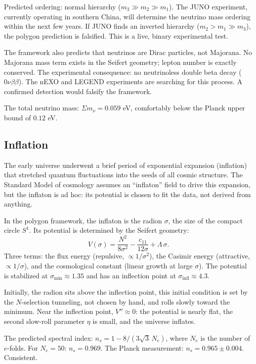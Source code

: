 Predicted ordering: normal hierarchy ($m_3 \gg m_2 \gg m_1$).
The JUNO experiment, currently operating in southern China, will
determine the neutrino mass ordering within the next few years. If
JUNO finds an inverted hierarchy ($m_2 > m_1 \gg m_3$), the polygon
prediction is falsified. This is a live, binary experimental test.

The framework also predicts that neutrinos are Dirac particles, not
Majorana. No Majorana mass term exists in the Seifert geometry; lepton
number is exactly conserved. The experimental consequence: no
neutrinoless double beta decay ($0\nu\beta\beta$). The nEXO and
LEGEND experiments are searching for this process. A confirmed
detection would falsify the framework.

The total neutrino mass: $\Sigma m_\nu = 0.059$ eV, comfortably
below the Planck upper bound of $0.12$ eV.

\subsection*{Inflation}

The early universe underwent a brief period of exponential
expansion (inflation) that stretched quantum fluctuations into the
seeds of all cosmic structure. The Standard Model of cosmology
assumes an ``inflaton'' field to drive this expansion, but the
inflaton is ad hoc: its potential is chosen to fit the data, not
derived from anything.

In the polygon framework, the inflaton is the radion $\sigma$, the
size of the compact circle $S^1$. Its potential is determined by the
Seifert geometry:
\[
  V(\sigma) = \frac{N^2}{8\sigma^2} - \frac{c_{11}}{12\sigma}
  + \Lambda\,\sigma.
\]
Three terms: the flux energy (repulsive, $\propto 1/\sigma^2$), the
Casimir energy (attractive, $\propto 1/\sigma$), and the cosmological
constant (linear growth at large $\sigma$). The potential is stabilized
at $\sigma_{\min} \approx 1.35$ and has an inflection point at
$\sigma_{\mathrm{infl}} \approx 4.3$.

Initially, the radion sits above the inflection point, this initial condition
is set by the $N$-selection tunneling, not chosen by hand, and rolls
slowly toward the minimum. Near the inflection point, $V'' \approx 0$:
the potential is nearly flat, the second slow-roll parameter $\eta$ is
small, and the universe inflates.

The predicted spectral index: $n_s = 1 - 8/(3\sqrt{3}\,N_e)$, where
$N_e$ is the number of $e$-folds. For $N_e = 50$: $n_s = 0.969$.
The Planck measurement: $n_s = 0.965 \pm 0.004$. Consistent.

